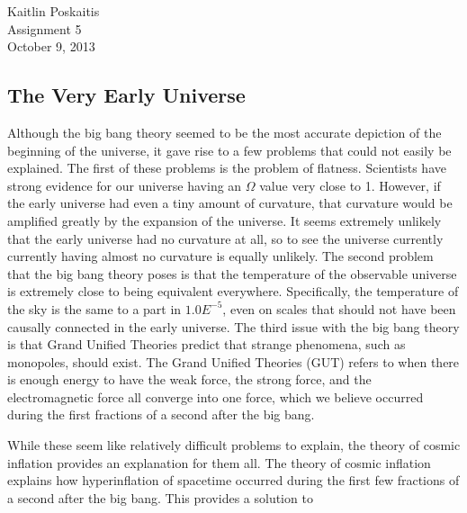 \documentclass[12pt]{article}
\begin{document}
\noindent Kaitlin Poskaitis\\
Assignment 5\\
October 9, 2013
\begin{center}
    \section*{\bf The Very Early Universe}
\end{center}


Although the big bang theory seemed to be the most accurate depiction of the
beginning of the universe, it gave rise to a few problems that could not easily
be explained.  The first of these problems is the problem of flatness.
Scientists have strong evidence for our universe having an $\Omega$ value very
close to 1.  However, if the early universe had even a tiny amount of curvature,
that curvature would be amplified greatly by the expansion of the universe. It
seems extremely unlikely that the early universe had no curvature at all, so to
see the universe currently currently having almost no curvature is equally
unlikely.  The second problem that the big bang theory poses is that the
temperature of the observable universe is extremely close to being equivalent
everywhere.  Specifically, the temperature of the sky is the same to a part in
$1.0E^{-5}$, even on scales that should not have been causally connected in the
early universe.  The third issue with the big bang theory is that Grand Unified
Theories
predict that strange phenomena, such as monopoles, should exist.  The Grand
Unified Theories (GUT) refers to when there is enough energy to have the weak
force, the strong force, and the electromagnetic force all converge into one
force, which we believe occurred during the first fractions of a second after the
big bang.

While these seem like relatively difficult problems to explain, the theory of
cosmic inflation provides an explanation for them all.  The theory of cosmic
inflation explains how hyperinflation of spacetime occurred during the first few
fractions of a second after the big bang.  This provides a solution to
\end{document}
